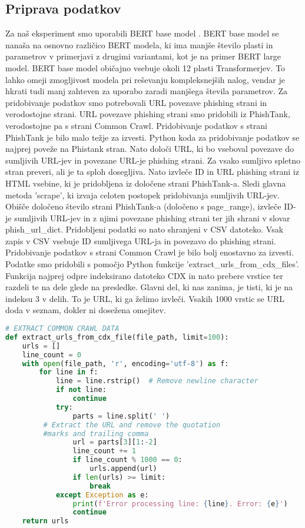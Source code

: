\documentclass[sigconf,nonacm]{acmart}
\begin{document}
\subsection{Priprava podatkov}
Za naš eksperiment smo uporabili BERT base model \cite{turc2019}. BERT base model se nanaša na osnovno različico BERT modela, ki ima manjše število plasti in parametrov v primerjavi z drugimi variantami, kot je na primer BERT large model. BERT base model običajno vsebuje okoli 12 plasti Transformerjev. To lahko omeji zmogljivost modela pri reševanju kompleksnejših nalog, vendar je hkrati tudi manj zahteven za uporabo zaradi manjšega števila parametrov.
Za pridobivanje podatkov smo potrebovali URL povezave phishing strani in verodostojne strani. URL povezave phishing strani smo pridobili iz PhishTank, verodostojne pa s strani Common Crawl.
Pridobivanje podatkov s strani PhishTank je bilo malo težje za izvesti. Python koda za pridobivanje podatkov se najprej poveže na Phistank stran. Nato določi URL, ki bo vseboval povezave do sumljivih URL-jev in povezane URL-je phishing strani. Za vsako sumljivo spletno stran preveri, ali je ta sploh dosegljiva. Nato izvleče ID in URL phishing strani iz HTML vsebine, ki je pridobljena iz določene strani PhishTank-a. Sledi glavna metoda 'scrape', ki izvaja celoten postopek pridobivanja sumljivih URL-jev. Obišče določeno število strani PhishTank-a (določeno s page\_range), izvleče ID-je sumljivih URL-jev in z njimi povezane phishing strani ter jih shrani v slovar phish\_url\_dict. Pridobljeni podatki so nato shranjeni v CSV datoteko. Vsak zapis v CSV vsebuje ID sumljivega URL-ja in povezavo do phishing strani.
Pridobivanje podatkov s strani Common Crawl je bilo bolj enostavno za izvesti. Podatke smo pridobili s pomočjo Python funkcije 'extract\_urls\_from\_cdx\_files'. Funkcija najprej odpre indeksirano datoteko CDX in nato prebere vrstice ter razdeli te na dele glede na presledke. Glavni del, ki nas zanima, je tisti, ki je na indeksu 3 v delih. To je URL, ki ga želimo izvleči. Vsakih 1000 vrstic se URL doda v seznam, dokler ni dosežena omejitev.

\begin{lstlisting}[language=Python, breaklines=false, xrightmargin=0.1\textwidth, basicstyle=\footnotesize]
# EXTRACT COMMON CRAWL DATA
def extract_urls_from_cdx_file(file_path, limit=100):
    urls = []
    line_count = 0
    with open(file_path, 'r', encoding='utf-8') as f:
        for line in f:
            line = line.rstrip()  # Remove newline character
            if not line:
                continue
            try:
                parts = line.split(' ')
	     # Extract the URL and remove the quotation 
	     #marks and trailing comma
                url = parts[3][1:-2]  
                line_count += 1
                if line_count % 1000 == 0:
                    urls.append(url)
                if len(urls) >= limit:
                    break
            except Exception as e:
                print(f'Error processing line: {line}. Error: {e}')
                continue
    return urls
\end{lstlisting}
\end{document}
